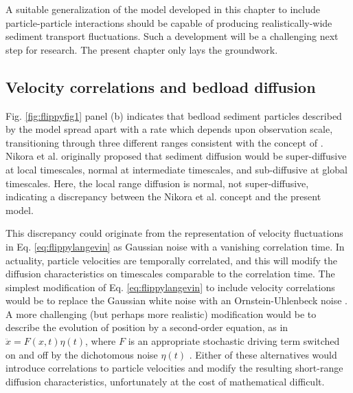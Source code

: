 A suitable generalization of the model developed in this chapter to include particle-particle interactions should be capable of producing realistically-wide sediment transport fluctuations. Such a development will be a challenging next step for research. The present chapter only lays the groundwork.

\subsection{Velocity correlations and bedload diffusion}
\label{sec:prollems}

Fig. \ref{fig:flippyfig1} panel (b) indicates that bedload sediment particles described by the model spread apart with a rate which depends upon observation scale, transitioning through three different ranges consistent with the concept of \citet{Nikora2001a,Nikora2002}.
Nikora et al. originally proposed that sediment diffusion would be super-diffusive at local timescales, normal at intermediate timescales, and sub-diffusive at global timescales.
Here, the local range diffusion is normal, not super-diffusive, indicating a discrepancy between the Nikora et al. concept and the present model.

This discrepancy could originate from the representation of velocity fluctuations in Eq. \ref{eq:flippylangevin} as Gaussian noise with a vanishing correlation time.
In actuality, particle velocities are temporally correlated, and this will modify the diffusion characteristics on timescales comparable to the correlation time. The simplest modification of Eq. \ref{eq:flippylangevin} to include velocity correlations would be to replace the Gaussian white noise with an Ornstein-Uhlenbeck noise \citep[e.g.][]{Luczka2005,Hanggi2007}. A more challenging (but perhaps more realistic) modification would be to describe the evolution of position by a second-order equation, as in $\ddot{x} = F(x,t)\eta(t)$, where $F$ is an appropriate stochastic driving term switched on and off by the dichotomous noise $\eta(t)$ \citep[e.g.][]{Masoliver1993}. Either of these alternatives would introduce correlations to particle velocities and modify the resulting short-range diffusion characteristics, unfortunately at the cost of mathematical difficult.

